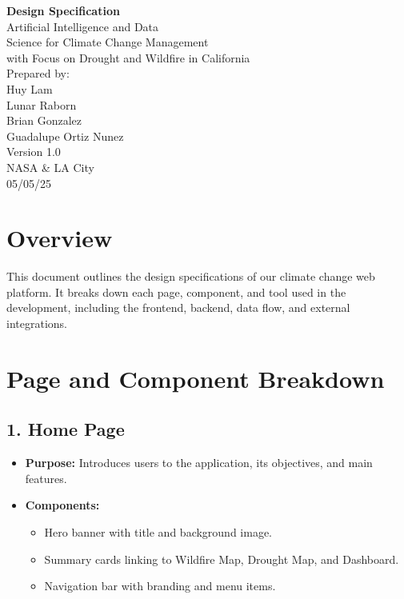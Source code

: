 \documentclass[12pt]{article}
\begin{document}
\begin{flushright}
\Huge \textbf{Design Specification} \\[2em]
\color{blue}
\LARGE Artificial Intelligence and Data\\
Science for Climate Change Management\\
with Focus on Drought and Wildfire in California\\[2em]
\color{black}
\large Prepared by:\\
Huy Lam\\
Lunar Raborn\\
Brian Gonzalez\\
Guadalupe Ortiz Nunez\\[1em]
Version 1.0\\
NASA \& LA City\\
05/05/25
\end{flushright}
\newpage

\tableofcontents
\newpage

\section{Overview}
This document outlines the design specifications of our climate change web platform. It breaks down each page, component, and tool used in the development, including the frontend, backend, data flow, and external integrations.

\section{Page and Component Breakdown}

\subsection{1. Home Page}
\begin{itemize}[leftmargin=*]
    \item \textbf{Purpose:} Introduces users to the application, its objectives, and main features.
    \item \textbf{Components:}
    \begin{itemize}
        \item Hero banner with title and background image.
        \item Summary cards linking to Wildfire Map, Drought Map, and Dashboard.
        \item Navigation bar with branding and menu items.
    \end{itemize}
\end{itemize}
\end{document}
